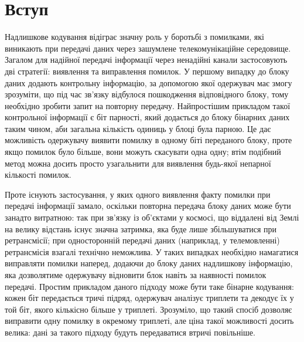 \documentclass[a4paper,14pt,oneside]{extarticle}
\begin{document}
\section*{Вступ}
Надлишкове кодування відіграє значну роль у боротьбі з помилками, які виникають при передачі даних через зашумлене телекомунікаційне середовище. 
Загалом для надійної передачі інформації через ненадійні канали застосовують дві стратегії: виявлення та виправлення помилок. 
У першому випадку до блоку даних додають контрольну інформацію, за допомогою якої одержувач має змогу зрозуміти, 
що під час зв'язку відбулося пошкодження відповідного блоку, тому необхідно зробити запит на повторну передачу. 
Найпростішим прикладом такої контрольної інформації є біт парності, який додається до блоку бінарних даних таким чином, аби загальна кількість одиниць у блоці була парною. 
Це дає можливість одержувачу виявити помилку в одному біті переданого блоку, проте якщо помилок було більше, вони можуть скасувати одна одну; 
втім подібний метод можна досить просто узагальнити для виявлення будь-якої непарної кількості помилок.

Проте існують застосування, у яких одного виявлення факту помилки при передачі інформації замало, оскільки повторна передача блоку даних може бути занадто витратною: 
так при зв'язку із об'єктами у космосі, що віддалені від Землі на велику відстань існує значна затримка, яка буде лише збільшуватися при ретрансмісії; 
при односторонній передачі даних (наприклад, у телемовленні) ретрансмісія взагалі технічно неможлива. 
У таких випадках необхідно намагатися виправляти помилки наперед, додаючи до блоку даних надлишкову інформацію, яка дозволятиме одержувачу відновити блок навіть за наявності помилок передачі. 
Простим прикладом даного підходу може бути таке бінарне кодування: кожен біт передається тричі підряд, одержувач аналізує триплети та декодує їх у той біт, якого кількісно більше у триплеті. 
Зрозуміло, що такий спосіб дозволяє виправити одну помилку в окремому триплеті, але ціна такої можливості досить велика: дані за такого підходу будуть передаватися втричі повільніше.
\end{document}
